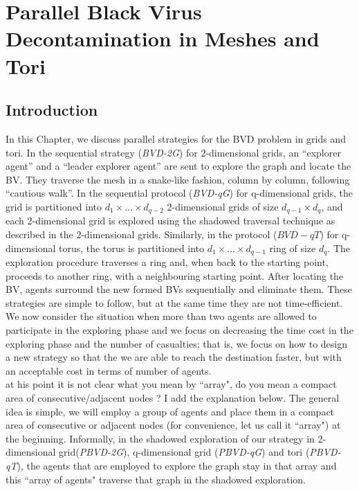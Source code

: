 \chapter {Parallel Black Virus Decontamination in Meshes and Tori}
\label{DL}
 
\section{Introduction}
In this Chapter, we discuss parallel strategies for the BVD problem in grids and tori. In the sequential strategy ({\em BVD-2G}) for 2-dimensional grids, an ``explorer agent'' and a ``leader explorer agent'' are sent to explore the graph and locate the BV. They traverse the mesh in a snake-like fashion, column by column, following   ``cautious walk''. In the sequential protocol ({\em BVD-qG}) for q-dimensional grids, the grid is partitioned into $d_1\times\ldots\times d_{q-2}$ 2-dimensional grids of size $d_{q-1}\times d_q$, and each 2-dimensional grid is explored using the shadowed traversal technique as described in the 2-dimensional grids. Similarly, in the protocol ($BVD-qT$) for q-dimensional torus, the torus is partitioned into $d_1\times \ldots \times d_{q-1}$ ring of size $d_q$. The exploration procedure traverses a ring and, when back to the starting point, proceeds to another ring, with a neighbouring starting point. After locating the BV, agents surround the new formed BVs sequentially and eliminate them. These strategies are simple to follow, but at the same time they are not time-efficient. We now consider the situation when  more than two agents are allowed to participate in the exploring phase and we focus on decreasing the time cost in the exploring phase and the number of casualties; that is, we focus on how to design a new strategy so that the we are able to reach the destination faster, but with  an acceptable cost in terms of number of agents.\\
\color{blue} at his point it is not clear what you mean by ``array", do you mean a compact area of consecutive/adjacent nodes ? I add the explanation below.
\color{black}
The general idea is simple, we will employ a group of agents and place them in a compact area of consecutive or adjacent nodes (for convenience, let us call it ``array") at the beginning.  Informally, in the shadowed exploration of our strategy in 2-dimensional grid({\em PBVD-2G}), q-dimensional grid ({\em PBVD-qG}) and tori ({\em PBVD-qT}), the agents that are employed to explore the graph stay in that array and this  ``array of agents"  traverse that graph in the shadowed exploration. 
